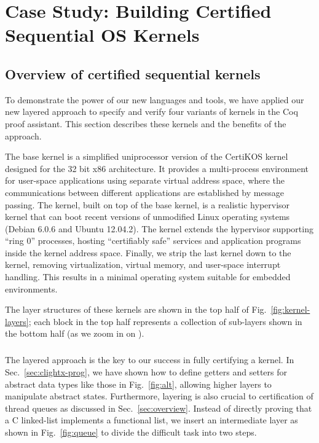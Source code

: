 \chapter{Case Study: Building Certified Sequential OS Kernels}
\label{chap:seqkernel}

\section{Overview of certified sequential kernels}
To demonstrate the power of our new languages and tools,
we have applied our new layered approach to specify and
verify four variants of \mCTOS{} kernels in the Coq proof assistant.
This section describes these kernels and the benefits of the approach.

The \mCTOSbase{} base kernel is a simplified uniprocessor version of
the CertiKOS kernel~\cite{gu11} designed for the 32 bit x86
architecture.  It provides a multi-process environment for user-space
applications using separate virtual address space, where the
communications between different applications are established by
message passing.  The \mCTOShyper{} kernel, built on top of the base
kernel, is a realistic hypervisor kernel that can boot recent versions
of unmodified Linux operating systems (Debian 6.0.6 and Ubuntu
12.04.2).  The \mCTOSringz{} kernel extends the hypervisor supporting
``ring 0'' processes, hosting ``certifiably safe'' services and
application programs inside the kernel address space.  Finally, we
strip the last kernel down to the \mCTOSembed{} kernel, removing
virtualization, virtual memory, and user-space interrupt handling.
This results in a minimal operating system suitable for embedded
environments.

The layer structures of these kernels are shown in the top half of
Fig.\ \ref{fig:kernel-layers};
each block in the top half represents a collection
of sub-layers shown in the bottom half (as we zoom in on \mCTOShyper).

\paragraph{\mCTOSbase{}}
The layered approach is the key to our success in fully certifying a kernel.
In Sec.~\ref{sec:clightx-prog}, we have shown how to define getters and
setters for abstract data types like those in Fig.\ \ref{fig:alt},
allowing higher layers to manipulate abstract states.
Furthermore, layering is also crucial to certification of thread queues
as discussed in Sec.~\ref{sec:overview}.
Instead of directly proving that a C linked-list implements a functional list,
we insert an intermediate layer as shown in Fig.~\ref{fig:queue}
to divide the difficult task into two steps.


